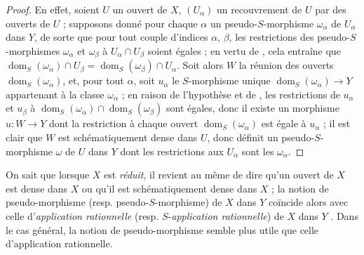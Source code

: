 \begin{proof}
En effet, soient $U$ un ouvert de $X$, $(U_\alpha)$ un recouvrement de $U$ par des ouverts de $U$ ; supposons donné pour chaque $\alpha$ un pseudo-$S$-morphisme $\omega_\alpha$ de $U_\alpha$ dans $Y$, de sorte que pour tout couple d'indices $\alpha$, $\beta$, les restrictions  des pseudo-$S$-morphismes $\omega_\alpha$ et $\omega_\beta$ à $U_\alpha\cap U_\beta$ soient égales ; en vertu de , cela entraîne que $\operatorname{dom}_S(\omega_\alpha)\cap U_\beta=\operatorname{dom}_S(\omega_\beta)\cap U_\alpha$.
Soit alors $W$ la réunion des ouverts $\operatorname{dom}_S(\omega_\alpha)$, et, pour tout $\alpha$, soit $u_\alpha$ le $S$-morphisme unique $\operatorname{dom}_S(\omega_\alpha)\to Y$ appartenant à la classe $\omega_\alpha$  ; en raison de l'hypothèse et de , les restrictions de $u_\alpha$ et $u_\beta$ à $\operatorname{dom}_S(\omega_\alpha)\cap\operatorname{dom}_S(\omega_\beta)$ sont égales, donc il existe un morphisme $u:W\to Y$ dont la restriction à chaque ouvert $\operatorname{dom}_S(\omega_\alpha)$ est égale à $u_\alpha$ ; il est clair que $W$ est schématiquement dense dans $U$, donc définit un pseudo-$S$-morphisme $\omega$ de $U$ dans $Y$ dont les restrictions aux $U_\alpha$ sont les $\omega_\alpha$.
\end{proof}

\begin{remark}[20.2.7]
\label{IV.20.2.7}
On sait  que lorsque $X$ est \emph{réduit}, il revient au même de dire qu'un ouvert de $X$ est dense dans $X$ ou qu'il est schématiquement dense dans $X$ ; la notion de pseudo-morphisme (resp. pseudo-$S$-morphisme) de $X$ dans $Y$ coïncide alors avec celle d'\emph{application rationnelle} (resp. $S$-\emph{application rationnelle}) de $X$ dans $Y$ .
Dans le cas général, la notion de pseudo-morphisme semble plus utile que celle d'application rationnelle.
\end{remark}

